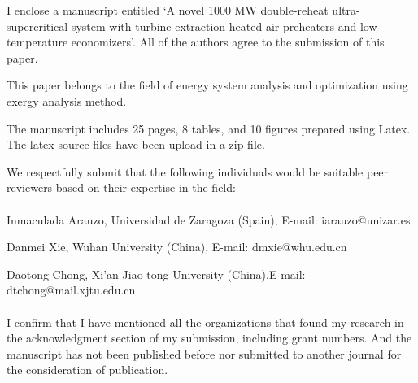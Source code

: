 \documentclass[10pt,stdletter,dateno,sigleft]{newlfm} %
\begin{document}
\begin{newlfm}


I enclose a manuscript entitled `A novel 1000 MW double-reheat ultra-supercritical system with turbine-extraction-heated air preheaters and low-temperature economizers'. 
All of the authors agree to the submission of this paper.

This paper belongs to the field of energy system analysis and optimization using exergy analysis method.

The manuscript includes 25 pages, 8 tables, and 10 figures prepared using Latex. 
The latex source files have been upload in a zip file.

We respectfully submit that the following individuals would be suitable peer reviewers based on their expertise in the field:
\\
\\
Inmaculada Arauzo, Universidad de Zaragoza (Spain), E-mail: iarauzo@unizar.es

Danmei Xie, Wuhan University (China), E-mail: dmxie@whu.edu.cn

Daotong Chong, Xi'an Jiao tong University (China),E-mail: dtchong@mail.xjtu.edu.cn
\\
\\

I confirm that I have mentioned all the organizations that found my research in the acknowledgment section of my submission, including grant numbers.
And the manuscript has not been published before nor submitted to another journal for the consideration of publication.








\end{newlfm}
\end{document}

